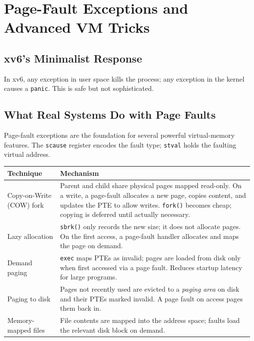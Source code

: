 \documentclass[11pt, a4paper]{article}
\begin{document}
\section{Page-Fault Exceptions and Advanced VM Tricks}

\subsection{xv6's Minimalist Response}

In xv6, any exception in user space kills the process; any exception in the kernel causes a \lstinline|panic|. This is safe but not sophisticated.

\subsection{What Real Systems Do with Page Faults}

Page-fault exceptions are the foundation for several powerful virtual-memory features. The \lstinline|scause| register encodes the fault type; \lstinline|stval| holds the faulting virtual address.

\begin{center}
\begin{tabular}{@{}p{3.8cm}p{9cm}@{}}
\toprule
\textbf{Technique}         & \textbf{Mechanism} \\
\midrule
Copy-on-Write (COW) fork   & Parent and child share physical pages mapped read-only. On a write, a page-fault allocates a new page, copies content, and updates the PTE to allow writes. \lstinline|fork()| becomes cheap; copying is deferred until actually necessary. \\[0.4em]
Lazy allocation            & \lstinline|sbrk()| only records the new size; it does not allocate pages. On the first access, a page-fault handler allocates and maps the page on demand. \\[0.4em]
Demand paging              & \lstinline|exec| maps PTEs as invalid; pages are loaded from disk only when first accessed via a page fault. Reduces startup latency for large programs. \\[0.4em]
Paging to disk             & Pages not recently used are evicted to a \emph{paging area} on disk and their PTEs marked invalid. A page fault on access pages them back in. \\[0.4em]
Memory-mapped files        & File contents are mapped into the address space; faults load the relevant disk block on demand. \\
\bottomrule
\end{tabular}
\end{center}
\end{document}
